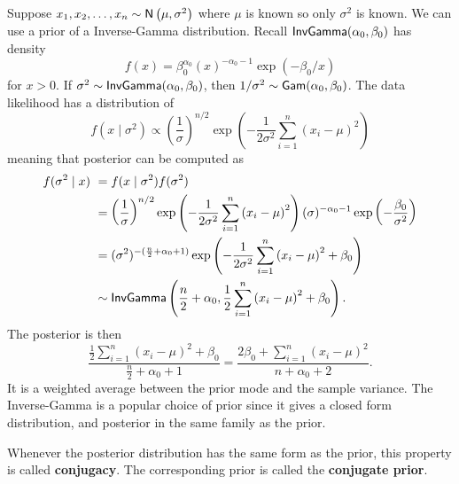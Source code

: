 \begin{exam} \label{exam: bay_norm_2}
    Suppose $x_1 , x_2 , \ldots , x_n \sim {\sf N} \left( \mu , \sigma^2 \right)$ where $\mu$ is known so only $\sigma^{2}$ is known. We can use a prior of a Inverse-Gamma distribution. Recall ${\sf InvGamma} (\alpha_0 , \beta_0)$ has density
    \[
        f(x) = \beta_0^{\alpha_0} \left( x \right)^{-\alpha_0 - 1} \exp \left( - \beta_0 / x \right)
    \]
    for $x > 0$. If $\sigma^2 \sim {\sf InvGamma} (\alpha_0 , \beta_0)$, then $1/\sigma^2 \sim {\sf Gam} (\alpha_0, \beta_0)$. The data likelihood has a distribution of
    \[
        f(x \mid \sigma^2) \propto \left( \frac{1}{\sigma} \right)^{n/2} \exp \left( - \frac{1}{2\sigma^2} \sum_{i=1}^{n} \left( x_i - \mu \right)^2 \right)
    \]
    meaning that posterior can be computed as
    \begin{align*}
        f (\sigma^2 \mid x) \
         & = f(x \mid \sigma^2) f(\sigma^2)                                                                                                                                                                    \\
         & = \left( \frac{1}{\sigma} \right)^{n/2} \exp \left( - \frac{1}{2\sigma^2} \sum_{i=1}^{n} \left( x_i - \mu \right)^2 \right) (\sigma)^{-\alpha_0 - 1} \exp \left( - \frac{\beta_0}{\sigma^2} \right) \\
         & = (\sigma^2)^{-(\frac{n}{2} + \alpha_0 + 1)} \exp \left( - \frac{1}{2\sigma^2} \sum_{i=1}^{n} \left( x_i - \mu \right)^2 + \beta_0 \right)                                                          \\
         & \sim {\sf InvGamma} \left( \frac{n}{2} + \alpha_0, \frac{1}{2} \sum_{i=1}^{n} \left( x_i - \mu \right)^2 + \beta_0 \right).
    \end{align*}
    The posterior is then
    \[
        \frac{\frac{1}{2} \sum_{i=1}^{n} \left( x_i - \mu \right)^2 + \beta_0}{\frac{n}{2} + \alpha_0 + 1} = \frac{2 \beta_0 + \sum_{i=1}^{n} \left( x_i - \mu \right)^2}{n + \alpha_0 + 2}.
    \]
    It is a weighted average between the prior mode and the sample variance. The Inverse-Gamma is a popular choice of prior since it gives a closed form distribution, and posterior in the same family as the prior.
\end{exam}

\begin{defe}[Conjugacy] \label{defe: conjugacy}
    Whenever the posterior distribution has the same form as the prior, this property is called {\bf conjugacy}. The corresponding prior is called the {\bf conjugate prior}.
\end{defe}

